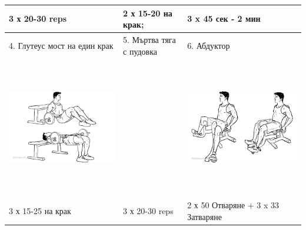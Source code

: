 \documentclass{article}
\begin{document}
\begin{tabular}{ | m{5cm} | m{5cm} | m{5cm} | }
3 х 20-30 reps & 2 х 15-20 на крак; & 3 x 45 сек - 2 мин \\
\hline
4. Глутеус мост на един крак & 5. Мъртва тяга с пудовка & 6. Абдуктор \\ 
\begin{minipage}{5cm} \includegraphics[width=\linewidth, height=60mm]{Barbell_Hip_Thrusts.png} \end{minipage} & 
&
\begin{minipage}{5cm} \includegraphics[width=\linewidth, height=60mm]{Adductor.png} \end{minipage} \\
3 х 15-25 на крак &  3 х 20-30 reps & 2 х 50 Отваряне + 3 x 33 Затваряне  \\ 
\hline
\end{tabular}
\end{document}
